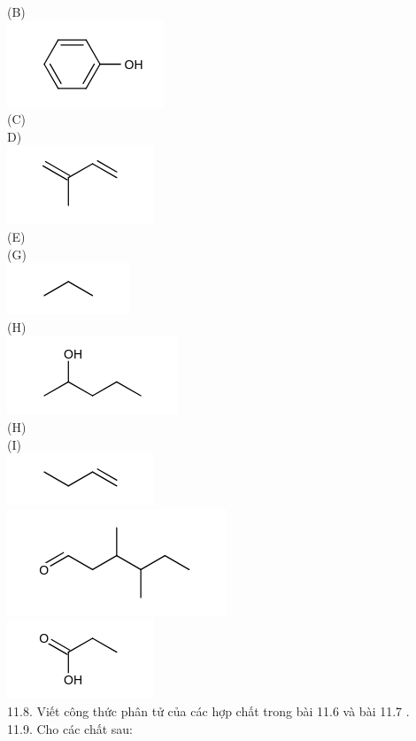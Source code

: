 \documentclass[10pt]{article}
\begin{document}
(B)\\
\includegraphics{smile-e30b8e6a114c4fbf4a203b224fe6a71e626c5094}\\
(C)\\
D)\\
\includegraphics{smile-0495e1fdf003b1bcddcae536c89d03281513b428}\\
(E)\\
(G)\\
\includegraphics{smile-a342d5ae863552008934768f4012cda939808b90}\\
(H)\\
\includegraphics{smile-33f64fae2ab10c2326279a2196a8bbf200db780e}\\
(H)\\
(I)\\
\includegraphics{smile-c7fbecaa77ab9d707e8a5cb7b3b7de216b23558b}\\
\includegraphics{smile-f3929d64c38ff73522eb28bb0f48f8a4d55ee893}\\
\includegraphics{smile-af15db94719476903920b3d594b83b167ada1db0}\\
11.8. Viết công thức phân tử của các hợp chất trong bài 11.6 và bài 11.7 .\\
11.9. Cho các chất sau:
\end{document}
